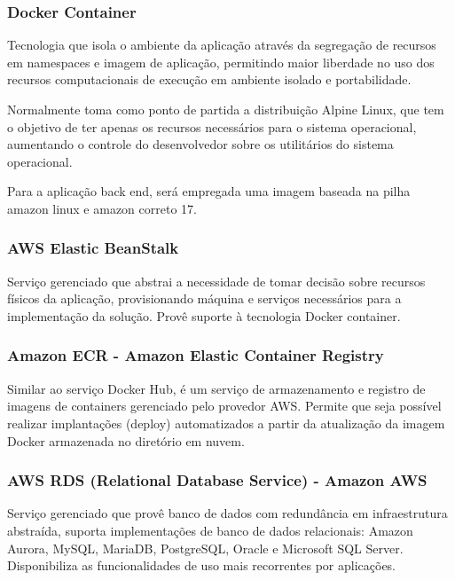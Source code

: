 \documentclass[
    12pt,               %
    openright,          %
    oneside,
    a4paper,            %
    BIBLATEX,           %
    TODO,               %
    english,            %
    brazil              %
    ]{ifsp-spo-inf-ctds}
\begin{document}
        \subsubsection{Docker Container}

            Tecnologia que isola o ambiente da aplicação através da segregação de recursos em namespaces e imagem de aplicação, permitindo maior liberdade no uso dos recursos computacionais de execução em ambiente isolado e portabilidade.
            
            Normalmente toma como ponto de partida a distribuição Alpine Linux, que tem o objetivo de ter apenas os recursos necessários para o sistema operacional, aumentando o controle do desenvolvedor sobre os utilitários do sistema operacional.
    
            Para a aplicação back end, será empregada uma imagem baseada na pilha amazon linux e amazon correto 17.
            
        \subsubsection{AWS Elastic BeanStalk}

            Serviço gerenciado que abstrai a necessidade de tomar decisão sobre recursos físicos da aplicação, provisionando máquina e serviços necessários para a implementação da solução. Provê suporte à tecnologia Docker container.
            
        \subsubsection{Amazon ECR - Amazon Elastic Container Registry}
        
            Similar ao serviço Docker Hub, é um serviço de armazenamento e registro de imagens de containers gerenciado pelo provedor AWS. Permite que seja possível realizar implantações (deploy) automatizados a partir da atualização da imagem Docker armazenada no diretório em nuvem.

        \subsubsection{AWS RDS (Relational Database Service) - Amazon AWS}

            Serviço gerenciado que provê banco de dados com redundância em infraestrutura abstraída, suporta implementações de banco de dados relacionais: Amazon Aurora, MySQL, MariaDB, PostgreSQL, Oracle e Microsoft SQL Server. Disponibiliza as funcionalidades de uso mais recorrentes por aplicações.
            
\end{document}
